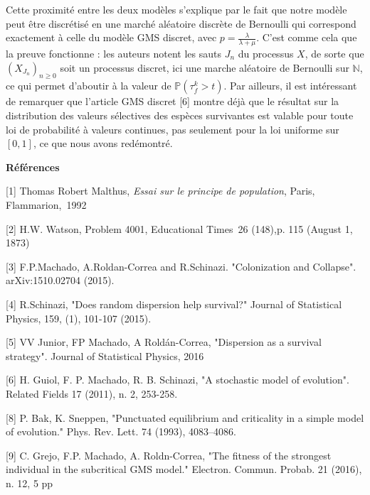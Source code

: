 \documentclass[12pt,a4paper]{article}
\begin{document}
Cette proximité entre les deux modèles s'explique par le fait que notre modèle peut être discrétisé en une marché aléatoire discrète de Bernoulli qui correspond exactement à celle du modèle GMS discret, avec $p=\frac{\lambda}{\lambda+\mu}$. C'est comme cela que la preuve fonctionne : les auteurs notent les sauts $J_n$ du processus $X$, de sorte que $(X_{J_n})_{n \geq 0}$ soit un processus discret, ici une marche aléatoire de Bernoulli sur $\mathbb{N}$, ce qui permet d'aboutir à la valeur de $\mathbb{P}(\tau_f^k > t)$. Par ailleurs, il est intéressant de remarquer que l'article GMS discret [6] montre déjà que le résultat sur la distribution des valeurs sélectives des espèces survivantes est valable pour toute loi de probabilité à valeurs continues, pas seulement pour la loi uniforme sur $[0,1]$, ce que nous avons redémontré. 

\newpage

\textbf{Références} 

[1] Thomas Robert Malthus, \textit{Essai sur le principe de population}, Paris, Flammarion, 1992 \par 

[2] H.W. Watson, Problem 4001, Educational Times 26 (148),p. 115 (August 1, 1873) \par

[3] F.P.Machado, A.Roldan-Correa and R.Schinazi. "Colonization and Collapse". arXiv:1510.02704 (2015).\par

[4] R.Schinazi, "Does random dispersion help survival?" Journal of Statistical Physics, 159, (1), 101-107 (2015).\par

[5] VV Junior, FP Machado, A Roldán-Correa, "Dispersion as a survival strategy". Journal of Statistical Physics, 2016 \par

[6] H. Guiol, F. P. Machado, R. B. Schinazi, "A stochastic model of evolution". Related Fields 17 (2011), n. 2, 253-258.\par

[8] P. Bak, K. Sneppen, "Punctuated equilibrium and criticality in a simple model of evolution." Phys. Rev. Lett. 74 (1993), 4083–4086.\par

[9] C. Grejo, F.P. Machado, A. Roldn-Correa, "The fitness of the strongest individual in the subcritical GMS model." Electron. Commun. Probab. 21 (2016), n. 12, 5 pp\par
\end{document}
